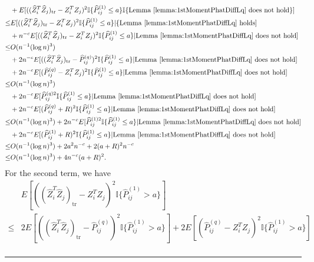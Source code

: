 \documentclass[a4paper]{article}
\newenvironment{proof}{{\bf Proof:  }}{\hfill\rule{2mm}{2mm}}
\renewcommand{\hat}{\widehat}
\begin{document}
\begin{proof}
\begin{align*}
	& + E[((\hat{Z}_i^T \hat{Z}_j)_{\mathrm{tr}} - Z_i^T Z_j)^2 \mathbb{I}\{\hat{P}^{(1)}_{ij} \le a\} \mathbb{I}\{\mathrm{Lemma\ } \ref{lemma:1stMomentPhatDiffLq} \mathrm{\ does\ not\ hold}\}] \\
	\le & E[((\hat{Z}_i^T \hat{Z}_j)_{\mathrm{tr}} - Z_i^T Z_j)^2 \mathbb{I}\{\hat{P}^{(1)}_{ij} \le a\} |\{\mathrm{Lemma\ } \ref{lemma:1stMomentPhatDiffLq} \mathrm{\ holds}] \\
	& + n^{-c} E[((\hat{Z}_i^T \hat{Z}_j)_{\mathrm{tr}} - Z_i^T Z_j)^2 \mathbb{I}\{\hat{P}^{(1)}_{ij} \le a\} | \mathrm{Lemma\ } \ref{lemma:1stMomentPhatDiffLq} \mathrm{\ does\ not\ hold}] \\
	\le & O(n^{-1} (\log n)^3) \\
	& + 2 n^{-c} E[((\hat{Z}_i^T \hat{Z}_j)_{\mathrm{tr}} - \hat{P}^{(q)}_{ij})^2 \mathbb{I}\{\hat{P}^{(1)}_{ij} \le a\} | \mathrm{Lemma\ } \ref{lemma:1stMomentPhatDiffLq} \mathrm{\ does\ not\ hold}] \\
	& + 2 n^{-c} E[(\hat{P}^{(q)}_{ij} - Z_i^T Z_j)^2 \mathbb{I}\{\hat{P}^{(1)}_{ij} \le a\} | \mathrm{Lemma\ } \ref{lemma:1stMomentPhatDiffLq} \mathrm{\ does\ not\ hold}] \\
	\le & O(n^{-1} (\log n)^3) \\
	& + 2 n^{-c} E[\hat{P}^{(q)2}_{ij} \mathbb{I}\{\hat{P}^{(1)}_{ij} \le a\} | \mathrm{Lemma\ } \ref{lemma:1stMomentPhatDiffLq} \mathrm{\ does\ not\ hold}] \\
	& + 2 n^{-c} E[(\hat{P}^{(q)}_{ij} + R)^2 \mathbb{I}\{\hat{P}^{(1)}_{ij} \le a\} | \mathrm{Lemma\ } \ref{lemma:1stMomentPhatDiffLq} \mathrm{\ does\ not\ hold}] \\
	\le & O(n^{-1} (\log n)^3)
	+ 2 n^{-c} E[\hat{P}^{(1)2}_{ij} \mathbb{I}\{\hat{P}^{(1)}_{ij} \le a\} | \mathrm{Lemma\ } \ref{lemma:1stMomentPhatDiffLq} \mathrm{\ does\ not\ hold}] \\
	& + 2 n^{-c} E[(\hat{P}^{(1)}_{ij} + R)^2 \mathbb{I}\{\hat{P}^{(1)}_{ij} \le a\} | \mathrm{Lemma\ } \ref{lemma:1stMomentPhatDiffLq} \mathrm{\ does\ not\ hold}] \\
	\le & O(n^{-1} (\log n)^3) + 2 a^2 n^{-c} + 2 (a+R)^2 n^{-c} \\
	\le & O(n^{-1} (\log n)^3) + 4 n^{-c} (a + R)^2.
\end{align*}
For the second term, we have
\begin{align*}
	& E[((\hat{Z}_i^T \hat{Z}_j)_{\mathrm{tr}} - Z_i^T Z_j)^2 \mathbb{I}\{\hat{P}^{(1)}_{ij} > a\}] \\
	\le & 2 E[((\hat{Z}_i^T \hat{Z}_j)_{\mathrm{tr}} - \hat{P}^{(q)}_{ij})^2 \mathbb{I}\{\hat{P}^{(1)}_{ij} > a\}] + 2 E[(\hat{P}^{(q)}_{ij} - Z_i^T Z_j)^2 \mathbb{I}\{\hat{P}^{(1)}_{ij} > a\}] \\

\end{align*}
\end{proof}
\end{document}
